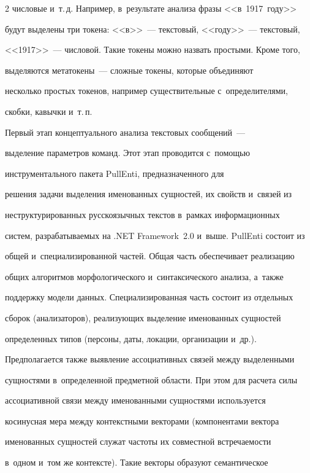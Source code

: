 \begin{multicols}{2}
чис\-ло\-вые и~т.\,д. Например, в~результате анализа фразы <<в~1917~году>> 


будут выделены три токена: <<в>>~--- текс\-то\-вый, <<году>>~--- текс\-то\-вый, 


<<1917>>~--- чис\-ло\-вой. Такие токены можно назвать простыми. \mbox{Кроме} того, 


выделяются метатокены~--- сложные токены, которые объединяют 


несколько прос\-тых токенов, например существительные с~определителями, 


скоб\-ки, кавычки и~т.\,п.


     


     Первый этап концептуального анализа текстовых сообщений~--- 


выделение параметров команд. Этот этап проводится с~помощью 


инструментального пакета PullEnti, предназначенного для 


решения задачи выделения именованных сущностей, их свойств и~связей из 


неструктурированных русскоязычных текстов в~рамках информационных 


систем, разрабатываемых на .NET Framework~2.0 и~выше. PullEnti состоит из 


общей и~специализированной частей. Общая часть обеспечивает реализацию 


общих алгоритмов морфологического и~синтаксического анализа, а~также 


поддержку модели данных. Специализированная часть состоит из отдельных 


сборок (анализаторов), реализующих выделение именованных сущностей 


определенных типов (персоны, даты, локации, организации и~др.). 


Предполагается также выявление ассоциативных связей между выделенными 


сущностями в~определенной предметной области. При этом для расчета силы 


ассоциативной связи между именованными сущностями используется 


косинусная мера между контекстными векторами (компонентами вектора 


именованных сущностей служат частоты их совместной встречаемости 


в~одном и~том же контексте). Такие векторы образуют семантическое 



\end{multicols}
